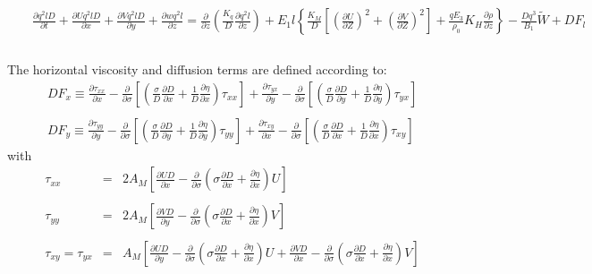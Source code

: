\documentclass[oribibl]{llncs}
\begin{document}
\begin{eqnarray}
\\   
&&\frac{\partial q^2 l D}{\partial t} + \frac{\partial U q^2 l D}{\partial x} +\frac{\partial V q^2 l D}{\partial y} + \frac{\partial w q^2 l}{\partial z}   = \frac{\partial}{\partial z} \left( \frac{K_q}{D} \frac{\partial q^2 l}{\partial z} \right)+ E_1  l \left\{ \frac{K_M}{D}\left[ \left( \frac{\partial U}{\partial Z}\right)^2 + \left( \frac{\partial V}{\partial Z}\right)^2 \right] + \frac{q E_3}{\rho_0}K_H\frac{\partial \rho}{\partial z} \right\} - \frac{D q^3}{B_1} \widetilde{W} + D F_l    \label{eq:final7}\nonumber \\ 
\nonumber  \\ 
\end{eqnarray}

The horizontal viscosity and diffusion terms are defined according to:
\begin{eqnarray}
DF_x \equiv \frac{\partial \tau_{xx}}{\partial x} -\frac{\partial}{\partial \sigma} \left[ \left(  \frac{\sigma}{D} \frac{\partial D}{\partial x} + \frac{1}{D} \frac{\partial \eta}{\partial x} \right) \tau_{xx}  \right] +  \frac{\partial \tau_{yx}}{\partial y} -\frac{\partial}{\partial \sigma} \left[ \left(  \frac{\sigma}{D} \frac{\partial D}{\partial y} + \frac{1}{D} \frac{\partial \eta}{\partial y} \right) \tau_{yx}  \right]   \\ 
\nonumber \\ 
DF_y \equiv \frac{\partial \tau_{yy}}{\partial y} -\frac{\partial}{\partial \sigma} \left[ \left(  \frac{\sigma}{D} \frac{\partial D}{\partial y} + \frac{1}{D} \frac{\partial \eta}{\partial y} \right) \tau_{yy}  \right] +  \frac{\partial \tau_{xy}}{\partial x} -\frac{\partial}{\partial \sigma} \left[ \left(  \frac{\sigma}{D} \frac{\partial D}{\partial x} + \frac{1}{D} \frac{\partial \eta}{\partial x} \right) \tau_{xy}  \right]   
\end{eqnarray}
with
\begin{eqnarray}
\tau_{xx} &=& 2 A_M \left[ \frac{\partial UD}{\partial x} -\frac{\partial}{\partial \sigma} \left( \sigma \frac{\partial D}{\partial x} + \frac{\partial \eta}{\partial x} \right)U \right] \\
\nonumber \\
\tau_{yy} &=& 2 A_M \left[ \frac{\partial VD}{\partial y} -\frac{\partial}{\partial \sigma} \left( \sigma \frac{\partial D}{\partial x} + \frac{\partial \eta}{\partial x} \right)V \right] \\
\nonumber \\
\tau_{xy} = \tau_{yx} &=& A_M  \left[ \frac{\partial UD}{\partial y} -\frac{\partial}{\partial \sigma} \left( \sigma \frac{\partial D}{\partial x} + \frac{\partial \eta}{\partial x} \right)U +  \frac{\partial VD}{\partial x} -\frac{\partial}{\partial \sigma} \left( \sigma \frac{\partial D}{\partial x} + \frac{\partial \eta}{\partial x} \right)V \right]
\end{eqnarray}
\end{document}
